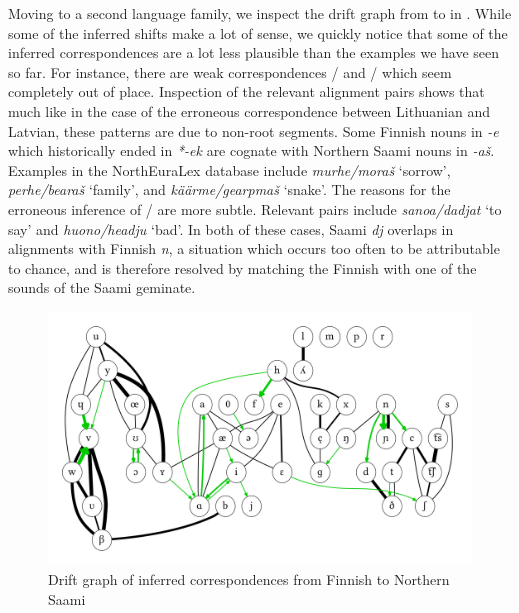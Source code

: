 Moving to a second language family, we inspect the drift graph from  to  in . While some of the inferred shifts make a lot of sense, we quickly notice that some of the inferred correspondences are a lot less plausible than the examples we have seen so far. For instance, there are weak correspondences \ipa{[E]}/\ipa{[S]} and \ipa{[n]}/\ipa{[c]} which seem completely out of place. Inspection of the relevant alignment pairs shows that much like in the case of the erroneous correspondence between Lithuanian and Latvian, these patterns are due to non-root segments. Some Finnish nouns in \textit{-e} which historically ended in \textit{*-ek} are cognate with Northern Saami nouns in \textit{-a\v{s}}. Examples in the NorthEuraLex database include \textit{murhe/mora\v{s}} `sorrow', \textit{perhe/beara\v{s}} `family', and \textit{k\"a\"arme/gearpma\v{s}} `snake'. The reasons for the erroneous inference of \ipa{[n]}/\ipa{[c]} are more subtle. Relevant pairs 
include \textit{sanoa/dadjat} `to say' and \textit{huono/headju} `bad'. In both of these cases, Saami \textit{dj} \ipa{[cc]} overlaps in alignments with Finnish \textit{n}, a situation which occurs too often to be attributable to chance, and is therefore resolved by matching the Finnish \ipa{[n]} with one of the \ipa{[c]} sounds of the Saami geminate.

\begin{figure}
    \includegraphics[width=\textwidth]{figures/drift-graph-fi-se.pdf}
    \caption{Drift graph of inferred correspondences from Finnish to Northern Saami}
    \label{fig:driftGraphFiSe}
\end{figure}

